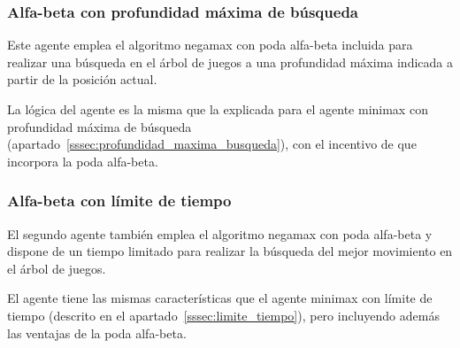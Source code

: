 \subsubsection{Alfa-beta con profundidad máxima de búsqueda}
\label{sssec:profundidad_maxima_busqueda_alfabeta}
Este agente emplea el algoritmo negamax con poda alfa-beta incluida para realizar una búsqueda en el árbol de juegos a una profundidad máxima indicada a partir de la posición actual.

La lógica del agente es la misma que la explicada para el agente minimax con profundidad máxima de búsqueda (apartado~\ref{sssec:profundidad_maxima_busqueda}), con el incentivo de que incorpora la poda alfa-beta.

\subsubsection{Alfa-beta con límite de tiempo}
\label{sssec:limite_tiempo_alfabeta}
El segundo agente también emplea el algoritmo negamax con poda alfa-beta y dispone de un tiempo limitado para realizar la búsqueda del mejor movimiento en el árbol de juegos.

El agente tiene las mismas características que el agente minimax con límite de tiempo (descrito en el apartado~\ref{sssec:limite_tiempo}), pero incluyendo además las ventajas de la poda alfa-beta.
